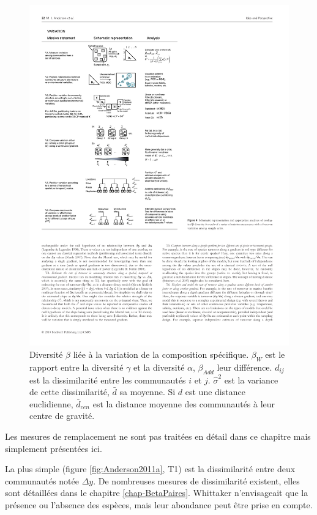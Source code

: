 \documentclass[
  11pt,
  french,
  a4paper,
  extrafontsizes,onecolumn,openright
  ]{memoir}
\begin{document}
\normalsize



\scriptsize

\begin{figure}

{\centering \includegraphics[width=0.8\linewidth]{images/Anderson2011b} 

}

\caption{Diversité \(\beta\) liée à la variation de la composition spécifique. \(\beta_W\) est le rapport entre la diversité \(\gamma\) et la diversité \(\alpha\), \(\beta_{Add}\) leur différence. \(d_{ij}\) est la dissimilarité entre les communautés \(i\) et \(j\). \(\hat{\sigma}^2\) est la variance de cette dissimilarité, \(\bar{d}\) sa moyenne. Si \(d\) est une distance euclidienne, \(\bar{d}_{cen}\) est la distance moyenne des communautés à leur centre de gravité.}\label{fig:Anderson2011b}
\end{figure}

\normalsize

Les mesures de remplacement ne sont pas traitées en détail dans ce chapitre mais simplement présentées ici.

La plus simple (figure \ref{fig:Anderson2011a}, T1) est la dissimilarité entre deux communautés notée \(\Delta{y}\).
De nombreuses mesures de dissimilarité existent, elles sont détaillées dans le chapitre \ref{chap-BetaPaires}.
Whittaker n'envisageait que la présence ou l'absence des espèces, mais leur abondance peut être prise en compte.
\end{document}
